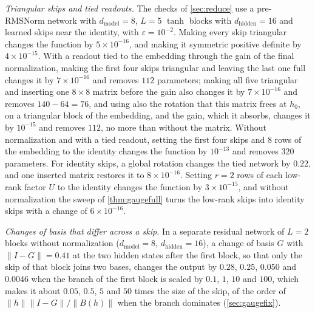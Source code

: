 \documentclass[10pt]{article}
\theoremstyle{definition}
\theoremstyle{remark}
\newcommand{\dm}{d_{\mathrm{model}}}
\newcommand{\dhid}{d_{\mathrm{hidden}}}
\newcommand{\norm}[1]{\lVert #1\rVert}
\begin{document}
\emph{Triangular skips and tied readouts.} The checks of \cref{sec:reduce} use a pre-RMSNorm network with $\dm = 8$, $L = 5$ $\tanh$ blocks with $\dhid = 16$ and learned skips near the identity, with $\varepsilon = 10^{-2}$. Making every skip triangular changes the function by $5\times10^{-16}$, and making it symmetric positive definite by $4\times10^{-15}$. With a readout tied to the embedding through the gain of the final normalization, making the first four skips triangular and leaving the last one full changes it by $7\times10^{-16}$ and removes $112$ parameters; making all five triangular and inserting one $8 \times 8$ matrix before the gain also changes it by $7\times10^{-16}$ and removes $140 - 64 = 76$, and using also the rotation that this matrix frees at $h_0$, on a triangular block of the embedding, and the gain, which it absorbs, changes it by $10^{-15}$ and removes $112$, no more than without the matrix. Without normalization and with a tied readout, setting the first four skips and $8$ rows of the embedding to the identity changes the function by $10^{-13}$ and removes $320$ parameters. For identity skips, a global rotation changes the tied network by $0.22$, and one inserted matrix restores it to $8\times10^{-16}$. Setting $r = 2$ rows of each low-rank factor $U$ to the identity changes the function by $3\times10^{-15}$, and without normalization the sweep of \cref{thm:gaugefull} turns the low-rank skips into identity skips with a change of $6\times10^{-16}$.

\emph{Changes of basis that differ across a skip.} In a separate residual network of $L = 2$ blocks without normalization ($\dm = 8$, $\dhid = 16$), a change of basis $G$ with $\norm{I - G} = 0.41$ at the two hidden states after the first block, so that only the skip of that block joins two bases, changes the output by $0.28$, $0.25$, $0.050$ and $0.0046$ when the branch of the first block is scaled by $0.1$, $1$, $10$ and $100$, which makes it about $0.05$, $0.5$, $5$ and $50$ times the size of the skip, of the order of $\norm{h}\norm{I - G}/\norm{B(h)}$ when the branch dominates (\cref{sec:gaugefix}).
\end{document}
